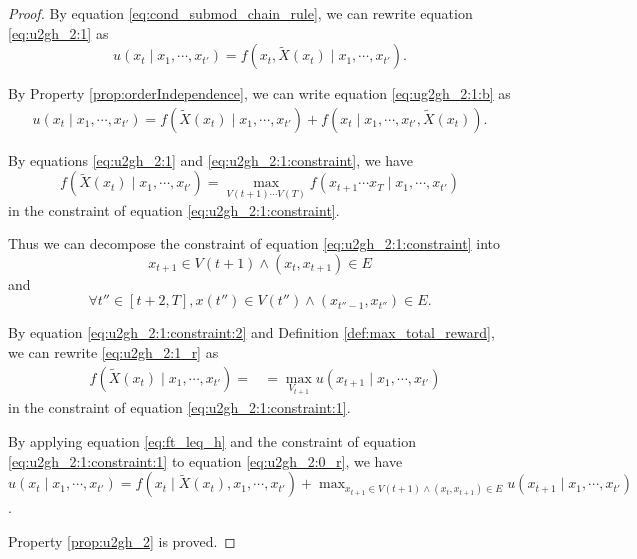 \documentclass[12pt]{article}
\begin{document}
\begin{proof}

By equation \eqref{eq:cond_submod_chain_rule}, we can rewrite equation \eqref{eq:u2gh_2:1} as
\begin{equation}
\label{eq:ug2gh_2:1:b}
u(x_{t} \mid x_{1} , \cdots , x_{t'} ) = f(x_{t}, \tilde{X}(x_{t}) \mid x_{1} , \cdots , x_{t'} ).
\end{equation}

By Property \ref{prop:orderIndependence}, we can write equation \eqref{eq:ug2gh_2:1:b} as
\begin{equation}
\label{eq:u2gh_2:0_r}
\begin{aligned}
u(x_{t} \mid x_{1} , \cdots , x_{t'} ) = 
f( \tilde{X}(x_{t}) \mid x_{1}, \cdots , x_{t'}) + f(x_{t} \mid x_{1}, \cdots , x_{t'}, \tilde{X}(x_{t})) .
\end{aligned}
\end{equation}

By equations \eqref{eq:u2gh_2:1} and \eqref{eq:u2gh_2:1:constraint}, we have
\begin{equation}
\label{eq:u2gh_2:1_r}
f( \tilde{X}(x_{t}) \mid x_{1}, \cdots , x_{t'}) = \max_{ V(t+1) \cdots V(T) } f( x_{t+1} \cdots x_{T} \mid x_{1} , \cdots , x_{t'} )
\end{equation}
in the constraint of equation \eqref{eq:u2gh_2:1:constraint}.

Thus we can decompose the constraint of equation \eqref{eq:u2gh_2:1:constraint} into
\begin{equation}
\label{eq:u2gh_2:1:constraint:1}
x_{t+1} \in V(t+1) \land ( x_{t}, x_{t+1} ) \in E
\end{equation}
and
\begin{equation}
\label{eq:u2gh_2:1:constraint:2}
\forall t'' \in [t+2, T], x(t'') \in V(t'') \land ( x_{t''-1}, x_{t''} ) \in E.
\end{equation}

By equation \eqref{eq:u2gh_2:1:constraint:2} and Definition \ref{def:max_total_reward}, we can rewrite \eqref{eq:u2gh_2:1_r} as
\begin{equation}
\label{eq:ft_leq_h}
\begin{aligned}
& f( \tilde{X}(x_{t}) \mid x_{1}, \cdots , x_{t'}) = 
& = \max_{V_{t+1}} u( x_{t+1} \mid x_{1} , \cdots , x_{t'} )
\end{aligned}
\end{equation}
in the constraint of equation \eqref{eq:u2gh_2:1:constraint:1}.

By applying equation \eqref{eq:ft_leq_h} and the constraint of equation \eqref{eq:u2gh_2:1:constraint:1} to equation \eqref{eq:u2gh_2:0_r}, we have
$ u( x_{t} \mid x_{1} , \cdots , x_{t'} ) = f( x_{t} \mid \tilde{X}(x_{t}), x_{1} , \cdots , x_{t'} ) +  \max_{x_{t+1} \in V(t+1) \land ( x_{t}, x_{t+1} ) \in E} u( x_{t+1} \mid x_{1} , \cdots , x_{t'} ) $.

Property \ref{prop:u2gh_2} is proved.

\end{proof}
\end{document}
